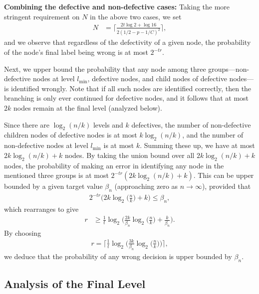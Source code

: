 \textbf{Combining the defective and non-defective cases:} Taking the more stringent requirement on $N$ in the above two cases, we set
\begin{align}
    N&=\bigg\lceil\frac{2t\log2+\log16}{2(1/2-p-1/C)^2}\bigg\rceil, \label{eq:Nchoice}
\end{align}
and we observe that regardless of the defectivity of a given node, the probability of the node's final label being wrong is at most $2^{-tr}$. 

Next, we upper bound the probability that any node among three groups---non-defective nodes at level $l_{\text{min}}$, defective nodes, and child nodes of defective nodes---is identified wrongly.  Note that if all such nodes are identified correctly, then the branching is only ever continued for defective nodes, and it follows that at most $2k$ nodes remain at the final level (analyzed below).

Since there are $\log_2(n/k)$ levels and $k$ defectives, the number of non-defective children nodes of defective nodes is at most $k\log_2(n/k)$, and the number of non-defective nodes at level $l_{\text{min}}$ is at most $k$. Summing these up, we have at most $2k\log_2(n/k)+k$ nodes. By taking the union bound over all $2k\log_2(n/k)+k$ nodes, the probability of making an error in identifying any node in the mentioned three groups is at most $2^{-tr}(2k\log_2(n/k)+k)$. This can be upper bounded by a given target value $\beta_n$ (approaching zero as $n\rightarrow\infty$), provided that
\begin{align}
    2^{-tr}\bigg(2k\log_2\Big(\frac{n}{k}\Big)+k\bigg)\leq\beta_n, \label{eq:beta_n_eq}
\end{align}
which rearranges to give
\begin{align}
    r&\geq\frac{1}{t}\log_2\bigg(\frac{2k}{\beta_n}\log_2\Big(\frac{n}{k}\Big)+\frac{k}{\beta_n}\bigg).
\end{align}
By choosing
\begin{align}
    r=\bigg\lceil\frac{1}{t}\log_2\bigg(\frac{3k}{\beta_n}\log_2\Big(\frac{n}{k}\Big)\bigg)\bigg\rceil,
\end{align}
we deduce that the probability of any wrong decision is upper bounded by $\beta_n$.

\subsection{Analysis of the Final Level}



